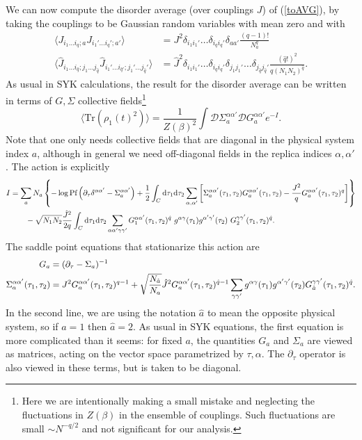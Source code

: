 \documentclass[12pt]{article}
\newcommand{\be}{\begin{equation}}
\newcommand{\ee}{\end{equation}}
\numberwithin{equation}{section}
\def\tr{\text{Tr}}
\begin{document}
We can now compute the disorder average (over couplings $J$) of (\ref{toAVG}), by taking the couplings to be Gaussian random variables with mean zero and with
\begin{align}
\langle J_{i_1\dots i_q;a} J_{i_1'\dots i_q';a'}\rangle &=J^2 \delta_{i_1 i_1'}\dots \delta_{i_q i_q'}\delta_{aa'} \frac{ (q-1)!}{N_a^q}\\
\langle \hat{J}_{i_1\dots i_{\hat{q}};j_1\dots j_{\hat{q}}} \hat{J}_{i_1'\dots i_{\hat{q}'};j_1'\dots j_{\hat{q}}'}\rangle &= \hat{J}^2\delta_{i_1 i_1'}\dots \delta_{i_q i_q'}\delta_{j_1j_1'}\dots \delta_{j_{\hat{q}}j_{\hat{q}}'}\frac{(\hat{q}!)^2}{q(N_1 N_2)^{\hat{q}}}.
\end{align}
As usual in SYK calculations, the result for the disorder average can be written in terms of $G,\Sigma$ collective fields\footnote{Here we are intentionally making a small mistake and neglecting the fluctuations in $Z(\beta)$ in the ensemble of couplings. Such fluctuations are small $\sim N^{-q/2}$ and not significant for our analysis.}
\be
\langle \tr\left(\rho_1(t)^2\right)\rangle = \frac{1}{Z(\beta)^2}\int\mathcal{D}\Sigma_{a}^{\alpha\alpha'}\mathcal{D}G_a^{\alpha\alpha'}e^{-I}.
\ee
Note that one only needs collective fields that are diagonal in the physical system index $a$, although in general we need off-diagonal fields in the replica indices $\alpha,\alpha'$. The action is explicitly
\begin{align}
I &= \sum_a N_a\left\{-\log\text{Pf}\left(\partial_\tau \delta^{\alpha\alpha'}-\Sigma_a^{\alpha\alpha'}\right) + \frac{1}{2}\int_C\mathrm{d}\tau_1\mathrm{d}\tau_2\sum_{\alpha,\alpha'}\left[\Sigma_a^{\alpha\alpha'}(\tau_1,\tau_2)G_a^{\alpha\alpha'}(\tau_1,\tau_2) - \frac{J^2}{q}G_{a}^{\alpha\alpha'}(\tau_1,\tau_2)^q\right]\right\}\notag\\&\hspace{20pt}- \sqrt{N_1N_2}\frac{\hat{J}^2}{2q}\int_C\mathrm{d}\tau_1\mathrm{d}\tau_2 \sum_{\alpha\alpha'\gamma\gamma'}G_1^{\alpha\alpha'}(\tau_1,\tau_2)^{\hat{q}} \ g^{\alpha\gamma}(\tau_1)g^{\alpha'\gamma'}(\tau_2) \ G_2^{\gamma\gamma'}(\tau_1,\tau_2)^{\hat{q}}.\label{SYKACTION}
\end{align}
The saddle point equations that stationarize this action are
\begin{align}
G_a &= (\partial_\tau - \Sigma_a)^{-1}\label{saddlePt}\\
\Sigma_a^{\alpha\alpha'}(\tau_1,\tau_2) &= J^2G_a^{\alpha\alpha'}(\tau_1,\tau_2)^{q-1} + \sqrt{\frac{N_{\hat{a}}}{N_a}}\hat{J}^2G_a^{\alpha\alpha'}(\tau_1,\tau_2)^{\hat{q}-1}\sum_{\gamma\gamma'}g^{\alpha\gamma}(\tau_1)g^{\alpha'\gamma'}(\tau_2)G_{\hat{a}}^{\gamma\gamma'}(\tau_1,\tau_2)^{\hat{q}}.\notag
\end{align}
In the second line, we are using the notation $\hat{a}$ to mean the opposite physical system, so if $a =1$ then $\hat{a} = 2$. As usual in SYK equations, the first equation is more complicated than it seems: for fixed $a$, the quantities $G_a$ and $\Sigma_a$ are viewed as matrices, acting on the vector space parametrized by $\tau,\alpha$. The $\partial_\tau$ operator is also viewed in these terms, but is taken to be diagonal.
\end{document}

